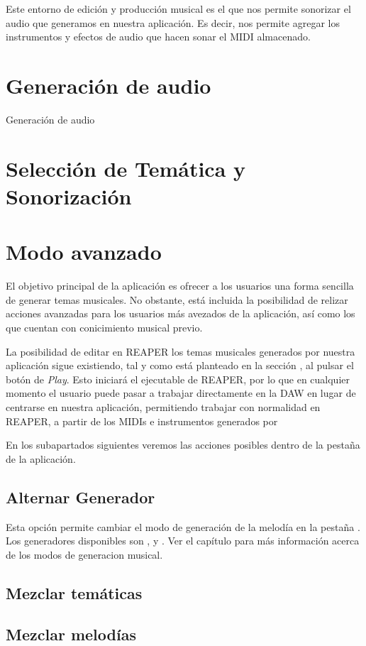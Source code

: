 	Este entorno de edición y producción musical es el que nos permite sonorizar el audio que generamos en nuestra aplicación. Es decir, nos permite agregar los instrumentos y efectos de audio que hacen sonar el MIDI almacenado. 

\section{Generación de audio}
\label{sec:generacionAudio}
	Generación de audio
\section{Selección de Temática y Sonorización}
\label{sec:SeleccionTematica}

\section{Modo avanzado}
\label{sec:app:advancedMode}
El objetivo principal de la aplicación es ofrecer a los usuarios una forma sencilla de generar temas musicales. No obstante, está incluida la posibilidad de relizar acciones avanzadas para los usuarios más avezados de la aplicación, así como los que cuentan con conicimiento musical previo.

La posibilidad de editar en REAPER los temas musicales generados por nuestra aplicación sigue existiendo, tal y como está planteado en la sección , al pulsar el botón de \textit{Play}. Esto iniciará el ejecutable de REAPER, por lo que en cualquier momento el usuario puede pasar a trabajar directamente en la DAW en lugar de centrarse en nuestra aplicación, permitiendo trabajar con normalidad en REAPER, a partir de los MIDIs e instrumentos generados por \appName{}

En los subapartados siguientes veremos las acciones posibles dentro de la pestaña \advancedTabName{} de la aplicación.

\subsection{Alternar Generador}
\label{subsec:alternarGenerador}
Esta opción permite cambiar el modo de generación de la melodía en la pestaña \generationTabName{}. Los generadores disponibles son ,  y . Ver el capítulo  para más información acerca de los modos de generacion musical.

\subsection{Mezclar temáticas}

\subsection{Mezclar melodías}
